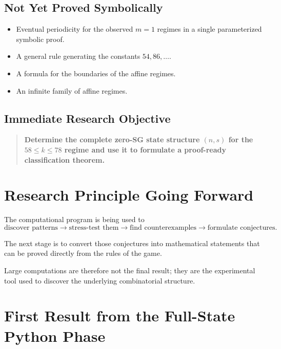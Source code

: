 \documentclass[11pt]{article}
\begin{document}
\subsection{Not Yet Proved Symbolically}
\begin{itemize}
    \item Eventual periodicity for the observed $m=1$ regimes in a single parameterized symbolic proof.
    \item A general rule generating the constants $54,86,\ldots$.
    \item A formula for the boundaries of the affine regimes.
    \item An infinite family of affine regimes.
\end{itemize}

\subsection{Immediate Research Objective}
\begin{quote}
\textbf{Determine the complete zero-SG state structure $(n,s)$ for the $58\le k\le78$ regime and use it to formulate a proof-ready classification theorem.}
\end{quote}

\section{Research Principle Going Forward}

The computational program is being used to
\begin{equation}
\boxed{
\text{discover patterns}
\longrightarrow
\text{stress-test them}
\longrightarrow
\text{find counterexamples}
\longrightarrow
\text{formulate conjectures}.
}
\end{equation}

The next stage is to convert those conjectures into mathematical statements that can be proved directly from the rules of the game.

Large computations are therefore not the final result; they are the experimental tool used to discover the underlying combinatorial structure.

\section{First Result from the Full-State Python Phase}
\end{document}
